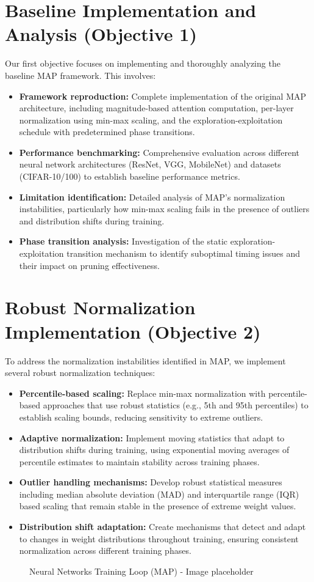 \documentclass[12pt,a4paper]{report}
\begin{document}
\section{Baseline Implementation and Analysis (Objective 1)}
Our first objective focuses on implementing and thoroughly analyzing the baseline MAP framework. This involves:
\begin{itemize}
    \item \textbf{Framework reproduction:} Complete implementation of the original MAP architecture, including magnitude-based attention computation, per-layer normalization using min-max scaling, and the exploration-exploitation schedule with predetermined phase transitions.
    \item \textbf{Performance benchmarking:} Comprehensive evaluation across different neural network architectures (ResNet, VGG, MobileNet) and datasets (CIFAR-10/100) to establish baseline performance metrics.
    \item \textbf{Limitation identification:} Detailed analysis of MAP's normalization instabilities, particularly how min-max scaling fails in the presence of outliers and distribution shifts during training.
    \item \textbf{Phase transition analysis:} Investigation of the static exploration-exploitation transition mechanism to identify suboptimal timing issues and their impact on pruning effectiveness.
\end{itemize}

\section{Robust Normalization Implementation (Objective 2)}
To address the normalization instabilities identified in MAP, we implement several robust normalization techniques:
\begin{itemize}
    \item \textbf{Percentile-based scaling:} Replace min-max normalization with percentile-based approaches that use robust statistics (e.g., 5th and 95th percentiles) to establish scaling bounds, reducing sensitivity to extreme outliers.
    \item \textbf{Adaptive normalization:} Implement moving statistics that adapt to distribution shifts during training, using exponential moving averages of percentile estimates to maintain stability across training phases.
    \item \textbf{Outlier handling mechanisms:} Develop robust statistical measures including median absolute deviation (MAD) and interquartile range (IQR) based scaling that remain stable in the presence of extreme weight values.
    \item \textbf{Distribution shift adaptation:} Create mechanisms that detect and adapt to changes in weight distributions throughout training, ensuring consistent normalization across different training phases.
\end{itemize}
\begin{figure}[h!]
    \centering
    \caption{Neural Networks Training Loop (MAP) - Image placeholder}
    \label{fig:map_workflow}
\end{figure}
\end{document}
